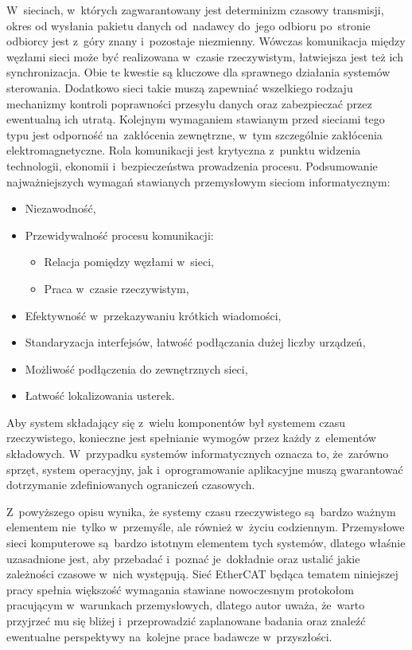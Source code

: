 W~sieciach, w~których zagwarantowany jest determinizm czasowy transmisji, okres od wysłania pakietu danych od~nadawcy do~jego odbioru po~stronie odbiorcy jest z~góry znany i~pozostaje niezmienny. Wówczas komunikacja między węzłami sieci może być realizowana w~czasie rzeczywistym, łatwiejsza jest też ich synchronizacja. Obie te kwestie są kluczowe dla sprawnego działania systemów sterowania. Dodatkowo sieci takie muszą zapewniać wszelkiego rodzaju mechanizmy kontroli poprawności przesyłu danych oraz zabezpieczać przez ewentualną ich utratą. Kolejnym wymaganiem stawianym przed sieciami tego typu jest odporność na~zakłócenia zewnętrzne, w~tym szczególnie zakłócenia elektromagnetyczne. Rola komunikacji jest krytyczna z~punktu widzenia technologii, ekonomii i~bezpieczeństwa prowadzenia procesu. \clearpage
Podsumowanie najważniejszych wymagań stawianych przemysłowym sieciom informatycznym:
\begin{itemize}
\item Niezawodność,
\item Przewidywalność procesu komunikacji:
\begin{itemize}
\item Relacja pomiędzy węzłami w~sieci,
\item Praca w~czasie rzeczywistym,
\end{itemize}
\item Efektywność w~przekazywaniu krótkich wiadomości,
\item Standaryzacja interfejsów, łatwość podłączania dużej liczby urządzeń,
\item Możliwość podłączenia do zewnętrznych sieci,
\item Łatwość lokalizowania usterek.
\end{itemize}

Aby system składający się z~wielu komponentów był systemem czasu rzeczywistego, konieczne jest spełnianie wymogów przez każdy z~elementów składowych. W~przypadku systemów informatycznych oznacza to, że~zarówno sprzęt, system operacyjny, jak i~oprogramowanie aplikacyjne muszą gwarantować dotrzymanie zdefiniowanych ograniczeń czasowych.

Z~powyższego opisu wynika, że systemy czasu rzeczywistego są~bardzo ważnym elementem nie~tylko w~przemyśle, ale również w~życiu codziennym. Przemysłowe sieci komputerowe są~bardzo istotnym elementem tych systemów, dlatego właśnie uzasadnione jest, aby przebadać i~poznać je~dokładnie oraz ustalić jakie zależności czasowe w~nich występują.
Sieć EtherCAT będąca tematem niniejszej pracy spełnia większość wymagania stawiane nowoczesnym protokołom pracującym w~warunkach przemysłowych, dlatego autor uważa, że~warto przyjrzeć mu się bliżej i~przeprowadzić zaplanowane badania oraz znaleźć ewentualne perspektywy na~kolejne prace badawcze w~przyszłości.
\clearpage
